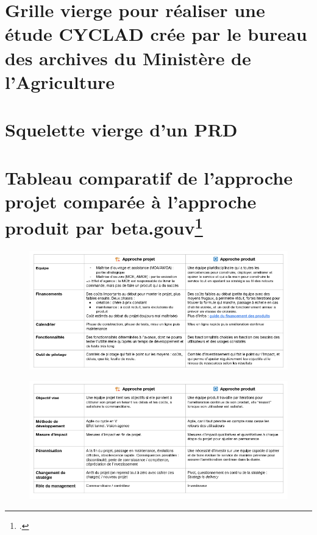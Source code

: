 \documentclass[a4paper,12pt,twoside]{book}
\begin{document}
	\chapter[Grille étude CYCLAD]{Grille vierge pour réaliser une étude CYCLAD crée par le bureau des archives du Ministère de l'Agriculture}
	\begin{landscape}
		
	\end{landscape}
	\label{annexed}
	
	\chapter[PRD vierge]{Squelette vierge d'un PRD}
	
	\label{annexee}
	
	\chapter[Mode projet et mode produit]{Tableau comparatif de l’approche projet comparée à l’approche produit par beta.gouv\footcite[pp.45-46]{betagouv_guide_2024}}
	\begin{figure}[h]
		\centering
		\includegraphics[scale=0.45]{annexes/annexe4.1.png}
		\label{annexe4.1}
	\end{figure}
	\begin{figure}[h]
		\centering
		\includegraphics[scale=0.45]{annexes/annexe4.2.png}
		\label{annexe4.2}
	\end{figure}
\end{document}
